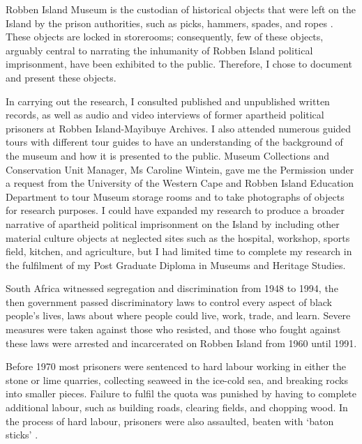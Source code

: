 Robben Island Museum is the custodian of historical objects that were left on the Island by the prison authorities, such as picks, hammers, spades, and ropes \parencite{Wintein_2015}. These objects are locked in storerooms; consequently, few of these objects, arguably central to narrating the inhumanity of Robben Island political imprisonment, have been exhibited to the public. Therefore, I chose to document and present these objects.


In carrying out the research, I consulted published and unpublished written records, as well as audio and video interviews of former apartheid political prisoners at Robben Island-Mayibuye Archives. I also attended numerous guided tours with different tour guides to have an understanding of the background of the museum and how it is presented to the public. Museum Collections and Conservation Unit Manager, Ms Caroline Wintein, gave me the Permission under a request from the University of the Western Cape and Robben Island Education Department to tour Museum storage rooms and to take photographs of objects for research purposes. I could have expanded my research to produce a broader narrative of apartheid political imprisonment on the Island by including other material culture objects at neglected sites such as the hospital, workshop, sports field, kitchen, and agriculture, but I had limited time to complete my research in the fulfilment of my Post Graduate Diploma in Museums and Heritage Studies.


\IJSRAseparator


South Africa witnessed segregation and discrimination from 1948 to 1994, the then government passed discriminatory laws to control every aspect of black people’s lives, laws about where people could live, work, trade, and learn. Severe measures were taken against those who resisted, and those who fought against these laws were arrested and incarcerated on Robben Island from 1960 until 1991.

Before 1970 most prisoners were sentenced to hard labour working in either the stone or lime quarries, collecting seaweed in the ice-cold sea, and breaking rocks into smaller pieces. Failure to fulfil the quota was punished by having to complete additional labour, such as building roads, clearing fields, and chopping wood. In the process of hard labour, prisoners were also assaulted, beaten with ‘baton sticks’ \parencite[54]{Hutton_1997}.

